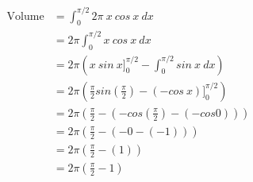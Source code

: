 \documentclass[9pt]{article}
\begin{document}
\begin{align*}
  \text{Volume} &= \int_0^{\pi/2} 2 \pi \ x \ cos \ x \ dx \\
  &= 2 \pi \int_0^{\pi / 2} x \ cos \ x \ dx \\
  &= 2 \pi (x \ sin \ x \bigg]_0^{\pi/2} - \int_0^{\pi/2} sin \ x \ dx) \\
  &= 2 \pi (\frac{\pi}{2} sin(\frac{\pi}{2}) - (- cos \ x) \bigg]_0^{\pi / 2}) \\
  &= 2 \pi (\frac{\pi}{2} - (- cos(\frac{\pi}{2}) - (- cos 0))) \\
  &= 2 \pi (\frac{\pi}{2} - (- 0 - (- 1))) \\
  &= 2 \pi (\frac{\pi}{2} - (1)) \\
  &= 2 \pi (\frac{\pi}{2} - 1)
\end{align*}
\end{document}
